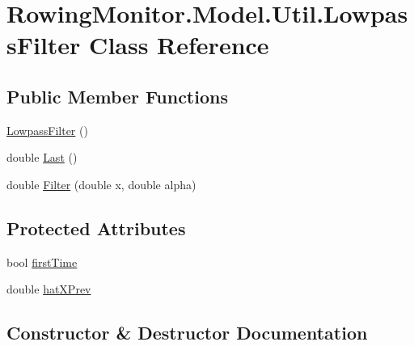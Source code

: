 \hypertarget{class_rowing_monitor_1_1_model_1_1_util_1_1_lowpass_filter}{}\section{Rowing\+Monitor.\+Model.\+Util.\+Lowpass\+Filter Class Reference}
\label{class_rowing_monitor_1_1_model_1_1_util_1_1_lowpass_filter}
\subsection*{Public Member Functions}
\begin{DoxyCompactItemize}
\item 
\hyperlink{class_rowing_monitor_1_1_model_1_1_util_1_1_lowpass_filter_a258e84fac0e6e0ab6abdf72c4aec1c41}{Lowpass\+Filter} ()
\item 
double \hyperlink{class_rowing_monitor_1_1_model_1_1_util_1_1_lowpass_filter_a2a851f6f9830809a675e07110f58c745}{Last} ()
\item 
double \hyperlink{class_rowing_monitor_1_1_model_1_1_util_1_1_lowpass_filter_a68efc64ceb80ce939a693f4a4389c0c8}{Filter} (double x, double alpha)
\end{DoxyCompactItemize}
\subsection*{Protected Attributes}
\begin{DoxyCompactItemize}
\item 
bool \hyperlink{class_rowing_monitor_1_1_model_1_1_util_1_1_lowpass_filter_a8d81ed9b3a6d910cf22d7ef743bb6163}{first\+Time}
\item 
double \hyperlink{class_rowing_monitor_1_1_model_1_1_util_1_1_lowpass_filter_a4f370cfcfee67c57efb594b6b4b0562d}{hat\+X\+Prev}
\end{DoxyCompactItemize}


\subsection{Constructor \& Destructor Documentation}
\mbox{\label{class_rowing_monitor_1_1_model_1_1_util_1_1_lowpass_filter_a258e84fac0e6e0ab6abdf72c4aec1c41}} 
